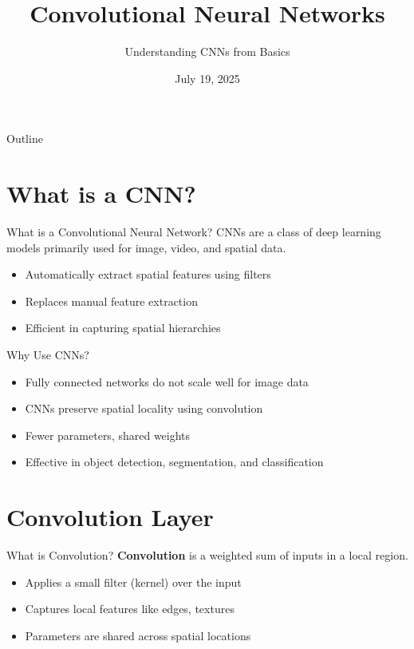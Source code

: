 \documentclass{beamer}
\title{Convolutional Neural Networks}
\subtitle{Understanding CNNs from Basics}
\date{July 19, 2025}
\begin{document}
{
\begin{frame}
    \titlepage
\end{frame}
}

\begin{frame}{Outline}
    \tableofcontents
\end{frame}

\section{What is a CNN?}
\begin{frame}{What is a Convolutional Neural Network?}
CNNs are a class of deep learning models primarily used for image, video, and spatial data.
\begin{itemize}
    \item Automatically extract spatial features using filters
    \item Replaces manual feature extraction
    \item Efficient in capturing spatial hierarchies
\end{itemize}
\end{frame}

\begin{frame}{Why Use CNNs?}
\begin{itemize}
    \item Fully connected networks do not scale well for image data
    \item CNNs preserve spatial locality using convolution
    \item Fewer parameters, shared weights
    \item Effective in object detection, segmentation, and classification
\end{itemize}
\end{frame}

\section{Convolution Layer}
\begin{frame}{What is Convolution?}
\textbf{Convolution} is a weighted sum of inputs in a local region.
\begin{itemize}
    \item Applies a small filter (kernel) over the input
    \item Captures local features like edges, textures
    \item Parameters are shared across spatial locations
\end{itemize}
\end{frame}
\end{document}
